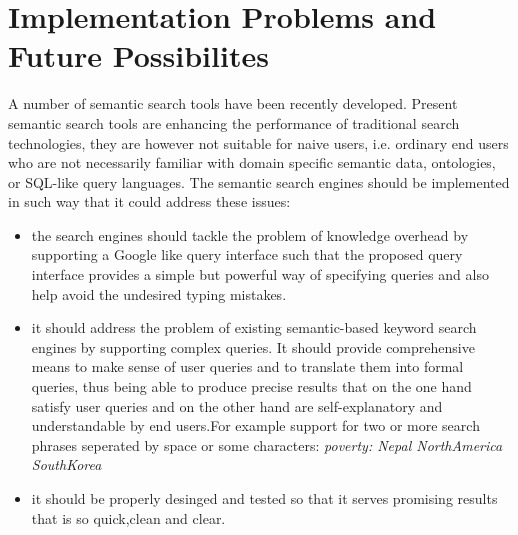 \documentclass[12pt,a4]{article}
\begin{document}
\section{Implementation Problems and Future Possibilites }
A number of semantic search tools have been recently developed. Present semantic search tools are enhancing the performance of traditional search technologies, they are however not suitable for naive users, i.e. ordinary end users who are not necessarily familiar with domain specific semantic data, ontologies, or SQL-like query languages. The semantic search engines should be implemented in such way that it could address these issues:
\begin{itemize}
\item the search engines should tackle the problem of knowledge overhead by supporting a Google like query interface such that the proposed query interface provides a simple but powerful way of specifying queries and also help avoid the undesired typing mistakes.
\item it should address the problem of existing semantic-based keyword search engines by supporting complex queries. It should provide comprehensive means to make sense of user queries and to translate them into formal queries, thus being able to produce precise results that on the one hand satisfy user queries and on the other hand are self-explanatory and understandable by end users.For example support for two or more search phrases seperated by space or some characters: \textit{poverty: Nepal NorthAmerica SouthKorea } 
\item it should be properly desinged and tested so that it serves promising results that is so quick,clean and clear.
\end{itemize}
\end{document}
